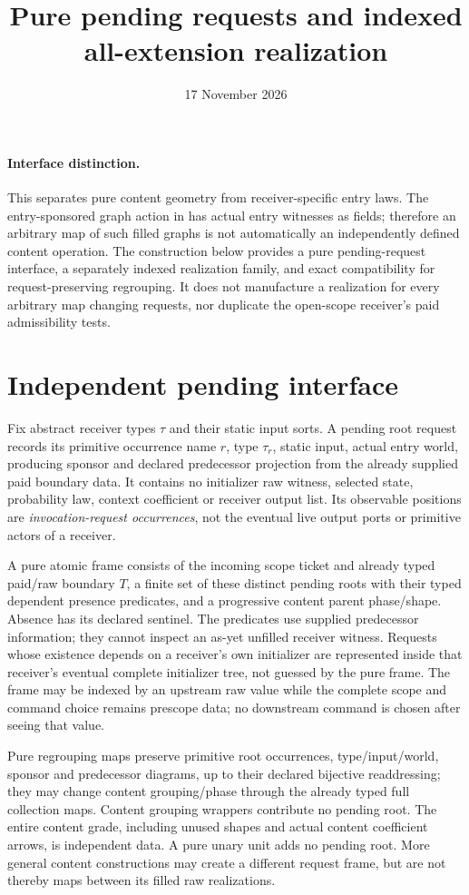 \documentclass[11pt]{article}
\title{Pure pending requests and indexed all-extension realization}
\date{17 November 2026}
\begin{document}
\maketitle
\paragraph{Interface distinction.}
This separates pure content geometry from receiver-specific entry laws. The entry-sponsored graph action in \texttt{} has actual entry witnesses as fields; therefore an arbitrary map of such filled graphs is not automatically an independently defined content operation. The construction below provides a pure pending-request interface, a separately indexed realization family, and exact compatibility for request-preserving regrouping. It does not manufacture a realization for every arbitrary map changing requests, nor duplicate the open-scope receiver's paid admissibility tests.

\section{Independent pending interface}
Fix abstract receiver types $\tau$ and their static input sorts. A pending root request records its primitive occurrence name $r$, type $\tau_r$, static input, actual entry world, producing sponsor and declared predecessor projection from the already supplied paid boundary data. It contains no initializer raw witness, selected state, probability law, context coefficient or receiver output list. Its observable positions are \emph{invocation-request occurrences}, not the eventual live output ports or primitive actors of a receiver.

A pure atomic frame consists of the incoming scope ticket and already typed paid/raw boundary $T$, a finite set of these distinct pending roots with their typed dependent presence predicates, and a progressive content parent phase/shape. Absence has its declared sentinel. The predicates use supplied predecessor information; they cannot inspect an as-yet unfilled receiver witness. Requests whose existence depends on a receiver's own initializer are represented inside that receiver's eventual complete initializer tree, not guessed by the pure frame. The frame may be indexed by an upstream raw value while the complete scope and command choice remains prescope data; no downstream command is chosen after seeing that value.

Pure regrouping maps preserve primitive root occurrences, type/input/world, sponsor and predecessor diagrams, up to their declared bijective readdressing; they may change content grouping/phase through the already typed full collection maps. Content grouping wrappers contribute no pending root. The entire content grade, including unused shapes and actual content coefficient arrows, is independent data. A pure unary unit adds no pending root. More general content constructions may create a different request frame, but are not thereby maps between its filled raw realizations.
\end{document}

